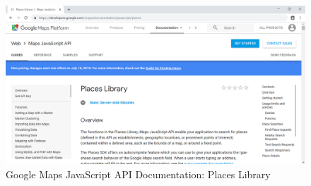 \begin{enumerate}
	      \begin{center}
	      	\begin{figure}[H]
	      		\centering
	      		\includegraphics[width=0.6\columnwidth]{images/appendixA/Google-Maps-Places-Library.PNG}
	      		\caption{Google Maps JavaScript API Documentation: Places Library}
	      	\end{figure}
	      \end{center}
\end{enumerate}

